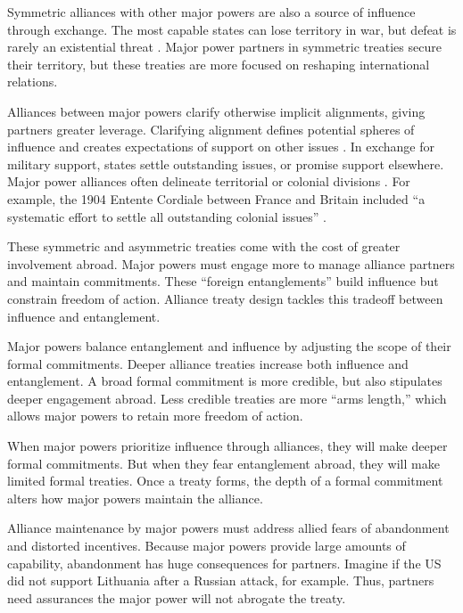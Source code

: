 \documentclass[12pt]{article}
\begin{document}
Symmetric alliances with other major powers are also a source of influence through exchange.
The most capable states can lose territory in war, but defeat is rarely an existential threat \citep{Fazal2011}.  
Major power partners in symmetric treaties secure their territory, but these treaties are more focused on reshaping international relations. 


Alliances between major powers clarify otherwise implicit alignments, giving partners greater leverage. 
Clarifying alignment defines potential spheres of influence and creates expectations of support on other issues \citep{Snyder1997}. 
In exchange for military support, states settle outstanding issues, or promise support elsewhere. 
Major power alliances often delineate territorial or colonial divisions \cite{Langer1950, Kissinger1994}.
For example, the 1904 Entente Cordiale between France and Britain included ``a systematic effort to settle all outstanding colonial issues'' \citep[pg. 189]{Kissinger1994}.   


These symmetric and asymmetric treaties come with the cost of greater involvement abroad.
Major powers must engage more to manage alliance partners and maintain commitments.
These ``foreign entanglements'' build influence but constrain freedom of action.
Alliance treaty design tackles this tradeoff between influence and entanglement. 


Major powers balance entanglement and influence by adjusting the scope of their formal commitments. 
Deeper alliance treaties increase both influence and entanglement. 
A broad formal commitment is more credible, but also stipulates deeper engagement abroad. 
Less credible treaties are more ``arms length,'' which allows major powers to retain more freedom of action. 


When major powers prioritize influence through alliances, they will make deeper formal commitments.
But when they fear entanglement abroad, they will make limited formal treaties. 
Once a treaty forms, the depth of a formal commitment alters how major powers maintain the alliance. 


Alliance maintenance by major powers must address allied fears of abandonment and distorted incentives. 
Because major powers provide large amounts of capability, abandonment has huge consequences for partners. 
Imagine if the US did not support Lithuania after a Russian attack, for example. 
Thus, partners need assurances the major power will not abrogate the treaty. 
\end{document}
